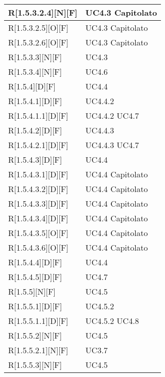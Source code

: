 \begin{longtable}{X | X}
\hline
R[1.5.3.2.4][N][F] & UC4.3 \newline Capitolato \\
\hline
R[1.5.3.2.5][O][F] & UC4.3 \newline Capitolato \\
\hline
R[1.5.3.2.6][O][F] & UC4.3 \newline Capitolato \\
\hline
R[1.5.3.3][N][F] & UC4.3 \\
\hline
R[1.5.3.4][N][F] & UC4.6 \\
\hline
R[1.5.4][D][F] & UC4.4 \\
\hline
R[1.5.4.1][D][F] & UC4.4.2 \\
\hline
R[1.5.4.1.1][D][F] & UC4.4.2 \newline UC4.7 \\
\hline
R[1.5.4.2][D][F] & UC4.4.3 \\
\hline
R[1.5.4.2.1][D][F] & UC4.4.3 \newline UC4.7 \\
\hline
R[1.5.4.3][D][F] & UC4.4 \\
\hline
R[1.5.4.3.1][D][F] & UC4.4 \newline Capitolato \\
\hline
R[1.5.4.3.2][D][F] & UC4.4 \newline Capitolato \\
\hline
R[1.5.4.3.3][D][F] & UC4.4 \newline Capitolato \\
\hline
R[1.5.4.3.4][D][F] & UC4.4 \newline Capitolato \\
\hline
R[1.5.4.3.5][O][F] & UC4.4 \newline Capitolato \\
\hline
R[1.5.4.3.6][O][F] & UC4.4 \newline Capitolato \\
\hline
R[1.5.4.4][D][F] & UC4.4 \\
\hline
R[1.5.4.5][D][F] & UC4.7 \\
\hline
R[1.5.5][N][F] & UC4.5 \\
\hline
R[1.5.5.1][D][F] & UC4.5.2 \\
\hline
R[1.5.5.1.1][D][F] & UC4.5.2 \newline UC4.8 \\
\hline
R[1.5.5.2][N][F] & UC4.5 \\
\hline
R[1.5.5.2.1][N][F] & UC3.7 \\
\hline
R[1.5.5.3][N][F] & UC4.5 \\

\end{longtable}
